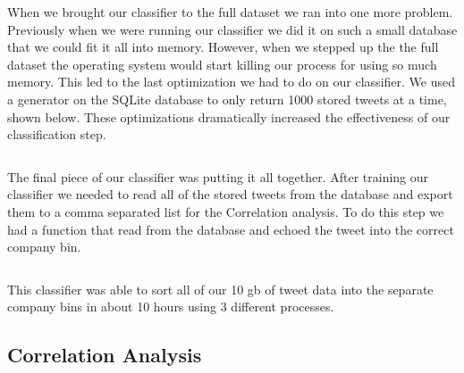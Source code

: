 \documentclass{acm_proc_article-sp}
\begin{document}
When we brought our classifier to the full dataset we ran into one more problem. 
Previously when we were running our classifier we did it on such a small database that we 
could fit it all into memory. However, when we stepped up the the full dataset the operating
system would start killing our process for using so much memory. This led to the last
optimization we had to do on our classifier. We used a generator on the SQLite database
to only return 1000 stored tweets at a time, shown below. These optimizations dramatically 
increased the effectiveness of our classification step.

\inputminted{python}{examples/generator.py}

The final piece of our classifier was putting it all together. After training our classifier
we needed to read all of the stored tweets from the database and export them 
to a comma separated list for the Correlation analysis. To do this step we had a
function that read from the database and echoed the tweet into the correct company bin.

\inputminted{python}{examples/converter.py}

This classifier was able to sort all of our 10 gb of tweet data into the separate company bins
in about 10 hours using 3 different processes. 

\subsection{Correlation Analysis}
\end{document}
